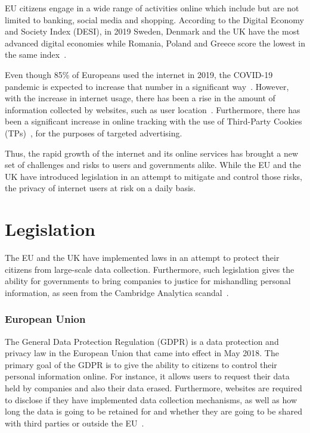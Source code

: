 \documentclass[../main.tex]{subfiles}
\begin{document}
EU citizens engage in a wide range of activities online which include but are not limited to banking, social media and shopping. According to the Digital Economy and Society Index (DESI), in 2019 Sweden, Denmark and the UK have the most advanced digital economies while Romania, Poland and Greece score the lowest in the same index~\cite{desi_2019}.

Even though 85\% of Europeans used the internet in 2019, the COVID-19 pandemic is expected to increase that number in a significant way~\cite{desi_2020}. However, with the increase in internet usage, there has been a rise in the amount of information collected by websites, such as user location~\cite{hern_2018}. Furthermore, there has been a significant increase in online tracking with the use of Third-Party Cookies (TPs)~\cite{roesner_2012}, for the purposes of targeted advertising. 

Thus, the rapid growth of the internet and its online services has brought a new set of challenges and risks to users and governments alike. While the EU and the UK have introduced legislation in an attempt to mitigate and control those risks, the privacy of internet users at risk on a daily basis. 

\section{Legislation}
The EU and the UK have implemented laws in an attempt to protect their citizens from large-scale data collection. Furthermore, such legislation gives the ability for governments to bring companies to justice for mishandling personal information, as seen from the Cambridge Analytica scandal~\cite{guardian_analytica}.

\subsubsection{European Union}
The General Data Protection Regulation (GDPR) is a data protection and privacy law in the European Union that came into effect in May 2018. The primary goal of the GDPR is to give the ability to citizens to control their personal information online. For instance, it allows users to request their data held by companies and also their data erased. Furthermore, websites are required to disclose if they have implemented data collection mechanisms, as well as how long the data is going to be retained for and whether they are going to be shared with third parties or outside the EU~\cite{gdpr_legal_text}.
\end{document}
